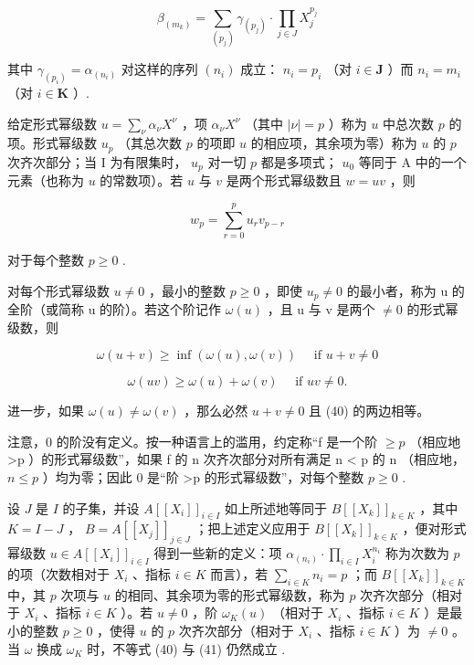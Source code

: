 \[
\beta_ {(m _ {k})} = \sum_ {(p _ {j})} \gamma_ {(p _ {j})} \cdot \prod_ {j \in J} X _ {j} ^ {p _ {j}}
\]

其中 \(\gamma_{(p_i)} = \alpha_{(n_i)}\) 对这样的序列 \((n_i)\) 成立： \(n_i = p_i\) （对 \(i \in \mathbf{J}\) ）而 \(n_i = m_i\) （对 \(i \in \mathbf{K}\) ）.

给定形式幂级数 \(u = \sum_{\nu} \alpha_{\nu} X^{\nu}\) ，项 \(\alpha_{\nu} X^{\nu}\) （其中 \(|\nu| = p\) ）称为 \(u\) 中总次数 \(p\) 的项。形式幂级数 \(u_p\) （其总次数 \(p\) 的项即 \(u\) 的相应项，其余项为零）称为 \(u\) 的 \(p\) 次齐次部分；当 I 为有限集时， \(u_p\) 对一切 \(p\) 都是多项式； \(u_0\) 等同于 A 中的一个元素（也称为 \(u\) 的常数项）。若 \(u\) 与 \(v\) 是两个形式幂级数且 \(w = uv\) ，则

\[
w _ {p} = \sum_ {r = 0} ^ {p} u _ {r} v _ {p - r}\tag{39}
\]

对于每个整数 \(p \geqslant 0\) .

对每个形式幂级数 \(u \neq 0\) ，最小的整数 \(p \geqslant 0\) ，即使 \(u_{p} \neq 0\) 的最小者，称为 u 的全阶（或简称 u 的阶）。若这个阶记作 \(\omega(u)\) ，且 u 与 v 是两个 \(\neq 0\) 的形式幂级数，则

\[
\omega (u + v) \geqslant \inf (\omega (u), \omega (v)) \quad \text { if } u + v \neq 0\tag{40}
\]

\[
\omega (u v) \geqslant \omega (u) + \omega (v) \quad \text { if } u v \neq 0.\tag{41}
\]

进一步，如果 \(\omega(u) \neq \omega(v)\) ，那么必然 \(u + v \neq 0\) 且 (40) 的两边相等。

注意，0 的阶没有定义。按一种语言上的滥用，约定称“f 是一个阶 \(\geqslant p\) （相应地 \textgreater p ）的形式幂级数”，如果 f 的 n 次齐次部分对所有满足 n \textless{} p 的 n （相应地， \(n \leqslant p\) ）均为零；因此 0 是“阶 \textgreater p 的形式幂级数”，对每个整数 \(p \geqslant 0\) .

设 \(J\) 是 \(I\) 的子集，并设 \(A[[X_i]]_{i \in I}\) 如上所述地等同于 \(B[[X_k]]_{k \in K}\) ，其中 \(K = I - J\) ， \(B = A[[X_j]]_{j \in J}\) ；把上述定义应用于 \(B[[X_k]]_{k \in K}\) ，便对形式幂级数 \(u \in A[[X_i]]_{i \in I}\) 得到一些新的定义：项 \(\alpha_{(n_i)} \cdot \prod_{i \in I} X_i^{n_i}\) 称为次数为 \(p\) 的项（次数相对于 \(X_i\) 、指标 \(i \in K\) 而言），若 \(\sum_{i \in K} n_i = p\) ；而 \(B[[X_k]]_{k \in K}\) 中，其 \(p\) 次项与 \(u\) 的相同、其余项为零的形式幂级数，称为 \(p\) 次齐次部分（相对于 \(X_i\) 、指标 \(i \in K\) ）。若 \(u \neq 0\) ，阶 \(\omega_K(u)\) （相对于 \(X_i\) 、指标 \(i \in K\) ）是最小的整数 \(p \geqslant 0\) ，使得 \(u\) 的 \(p\) 次齐次部分（相对于 \(X_i\) 、指标 \(i \in K\) ）为 \(\neq 0\) 。当 \(\omega\) 换成 \(\omega_K\) 时，不等式 (40) 与 (41) 仍然成立 .

